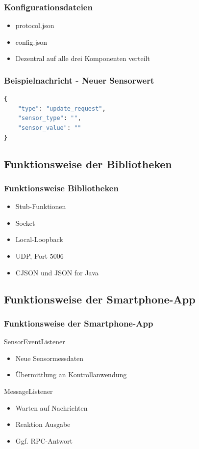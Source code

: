 \documentclass{beamer}
\begin{document}
\begin{frame}
\frametitle[]{Konfigurationsdateien}
\begin{itemize}
    \item protocol.json
    \item config.json
    \item Dezentral auf alle drei Komponenten verteilt
\end{itemize}
\end{frame}

\begin{frame}[fragile]
    \frametitle{Beispielnachricht - Neuer Sensorwert}
    \begin{lstlisting}[language=python]
{
    "type": "update_request",
    "sensor_type": "",
    "sensor_value": ""
}
\end{lstlisting}
\end{frame}

\subsection*{Funktionsweise der Bibliotheken}
\begin{frame}
    \frametitle[]{Funktionsweise Bibliotheken}
    \begin{itemize}
        \item Stub-Funktionen
        \item Socket
        \item Local-Loopback
        \item UDP, Port 5006
        \item CJSON und JSON for Java
    \end{itemize}
\end{frame}

\subsection*{Funktionsweise der Smartphone-App}
\begin{frame}
    \frametitle[]{Funktionsweise der Smartphone-App}
    SensorEventListener
    \begin{itemize}
        \item Neue Sensormessdaten
        \item Übermittlung an Kontrollanwendung
    \end{itemize}
    \vspace{1cm}
    MessageListener
    \begin{itemize}
        \item Warten auf Nachrichten
        \item Reaktion Ausgabe
        \item Ggf. RPC-Antwort
    \end{itemize}

\end{frame}
\end{document}
